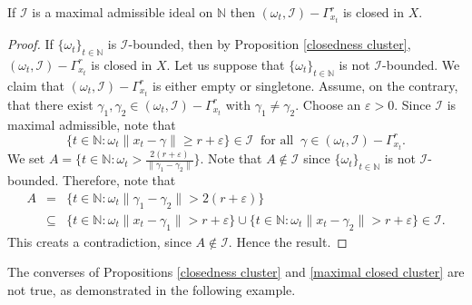 \documentclass[reqno]{amsart}
\begin{document}
{\begin{proposition}\label{maximal closed cluster}
	If  $\mathcal{I}$ is a maximal admissible ideal on $\mathbb{N}$ then $(\omega_t,\mathcal{I})-\Gamma_{x_t}^r$ is closed in $X$.
\end{proposition}
\begin{proof}
If $\{\omega_t\}_{t\in\mathbb{N}}$ is $\mathcal{I}$-bounded, then by Proposition \ref{closedness cluster}, $(\omega_t,\mathcal{I})-\Gamma_{x_t}^r$ is closed in $X$. Let us suppose that $\{\omega_t\}_{t\in\mathbb{N}}$ is not $\mathcal{I}$-bounded. We claim that $(\omega_t,\mathcal{I})-\Gamma_{x_t}^r$ is either empty or singletone. Assume, on the contrary, that there exist $\gamma_1,\gamma_2\in (\omega_t,\mathcal{I})-\Gamma_{x_t}^r$  with $\gamma_1\neq\gamma_2$. Choose an $\varepsilon>0$. Since $\mathcal{I}$ is maximal admissible, note that 
$$\{t\in\mathbb{N}:\omega_t\|x_t-\gamma\|\geq  r+\varepsilon\}\in\mathcal{I}~\mbox{ for all }~\gamma\in
(\omega_t,\mathcal{I})-\Gamma_{x_t}^r.$$
We set $A=\{t\in\mathbb{N}:\omega_t>\frac{2(r+\varepsilon)}{\|\gamma_1-\gamma_2\|}\}$. Note that  $A\notin\mathcal{I}$ since  $\{\omega_t\}_{t\in\mathbb{N}}$ is not $\mathcal{I}$-bounded. Therefore, note that
\begin{eqnarray*}
	A&=&\{t\in\mathbb{N}:\omega_t\|\gamma_1-\gamma_2\|>2(r+\varepsilon)\}\\
	&\subseteq& \{t\in\mathbb{N}:\omega_t\|x_t-\gamma_1\|>r+\varepsilon\}\cup \{t\in\mathbb{N}:\omega_t\|x_t-\gamma_2\|>r+\varepsilon\}\in\mathcal{I}.
\end{eqnarray*}
This creats a contradiction, since $A\notin\mathcal{I}$. Hence the result.
\end{proof}


The converses of Propositions \ref{closedness cluster} and \ref{maximal closed cluster} are not true, as demonstrated in the following example.


}
\end{document}
